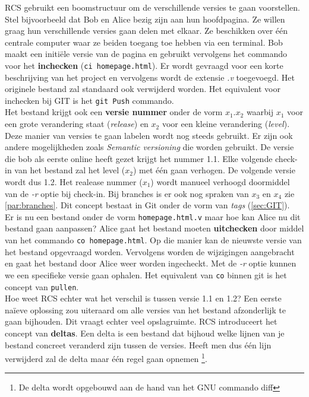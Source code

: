 RCS gebruikt een boomstructuur om de verschillende versies te gaan voorstellen. Stel bijvoorbeeld dat Bob en Alice bezig zijn aan hun hoofdpagina. Ze willen graag hun verschillende versies gaan delen met elkaar. Ze beschikken over één centrale computer waar ze beiden toegang toe hebben via een terminal. Bob maakt een initiële versie van de pagina en gebruikt vervolgens het commando voor het \textbf{inchecken} (\Verb+ci homepage.html+). Er wordt gevraagd voor een korte beschrijving van het project en vervolgens wordt de extensie \textit{.v} toegevoegd. Het originele bestand zal standaard ook verwijderd worden. Het equivalent voor inchecken bij GIT is het \verb+git Push+ commando.\\

Het bestand krijgt ook een \textbf{versie nummer} onder de vorm $x_1.x_2$ waarbij $x_1$ voor een grote verandering staat (\textit{release}) en $x_2$ voor een kleine verandering (\textit{level}). Deze manier van versies te gaan labelen wordt nog steeds gebruikt. Er zijn ook andere mogelijkheden zoals \textit{Semantic versioning} die worden gebruikt. De versie die bob als eerste online heeft gezet krijgt het nummer 1.1. Elke volgende check-in van het bestand zal het level ($x_2$) met één gaan verhogen. De volgende versie wordt dus 1.2. Het realease nummer ($x_1$) wordt manueel verhoogd doormiddel van de \textit{-r} optie bij check-in. Bij branches is er ook nog spraken van $x_3$ en $x_4$ zie \ref{par:branches}. Dit concept bestaat in Git onder de vorm van \textit{tags} (\ref{sec:GIT}).\\

Er is nu een bestand onder de vorm \Verb+homepage.html.v+ maar hoe kan Alice nu dit bestand gaan aanpassen? Alice gaat het bestand moeten \textbf{uitchecken} door middel van het commando  \verb+co homepage.html+. Op die manier kan de nieuwste versie van het bestand opgevraagd worden. Vervolgens worden de wijzigingen aangebracht en gaat het bestand door Alice weer worden ingecheckt. Met de \textit{-r} optie kunnen we een specifieke versie gaan ophalen. Het equivalent van \verb+co+ binnen git is het concept van \verb+pullen+.\\

Hoe weet RCS echter wat het verschil is tussen versie 1.1 en 1.2? Een eerste naïeve oplossing zou uiteraard om alle versies van het bestand afzonderlijk te gaan bijhouden. Dit vraagt echter veel opslagruimte. RCS introduceert het concept van \textbf{deltas}. Een delta is een bestand dat bijhoud welke lijnen van je bestand concreet veranderd zijn tussen de versies. Heeft men dus één lijn verwijderd zal de delta maar één regel gaan opnemen \footnote{De delta wordt opgebouwd aan de hand van het GNU commando diff}.\\

